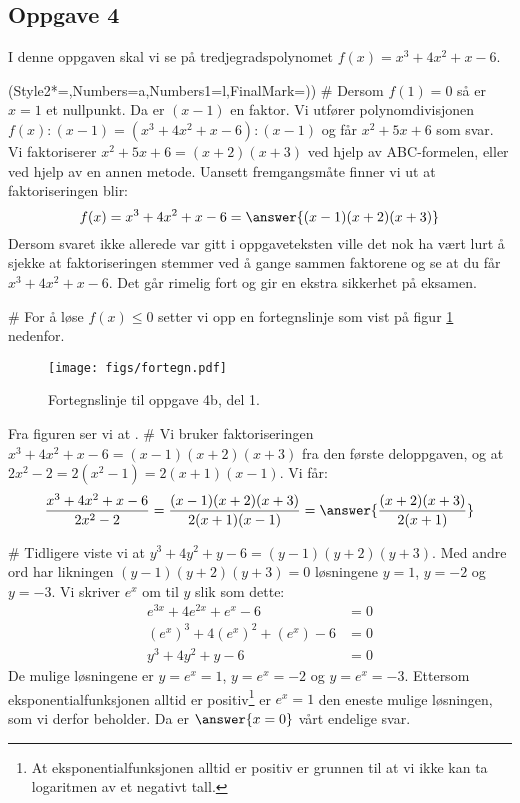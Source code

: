 \subsection*{Oppgave 4}
I denne oppgaven skal vi se på tredjegradspolynomet $f(x) = x^3 + 4x^2 + x - 6$.
\begin{easylist}[enumerate]
	\ListProperties(Style2*=,Numbers=a,Numbers1=l,FinalMark={)})
	# Dersom $f(1) = 0$ så er $x = 1$ et nullpunkt. Da er $(x-1)$ en faktor.
	Vi utfører polynomdivisjonen $f(x) : (x-1) = \left(x^3 + 4x^2 + x - 6\right): (x-1)$
	og får $x^2 + 5x + 6$ som svar. Vi faktoriserer $x^2 + 5x + 6 = (x+2)(x+3)$
	ved hjelp av ABC-formelen, eller ved hjelp av en annen metode.
	Uansett fremgangsmåte finner vi ut at faktoriseringen blir:
	\begin{equation*}
		f(x) = x^3 + 4x^2 + x - 6 = \answer{(x-1)(x+2) (x+3)}
	\end{equation*}
	Dersom svaret ikke allerede var gitt i oppgaveteksten ville det nok ha vært lurt å sjekke at faktoriseringen stemmer ved å gange sammen faktorene og
	se at du får $x^3 + 4x^2 + x - 6$. Det går rimelig fort og gir en ekstra sikkerhet på eksamen.
	
	# For å løse $f(x) \leq 0$ setter vi opp en fortegnslinje som vist på figur \ref{fig:fortegn} nedenfor.
	\begin{figure}[th!]
		\centering
		\texttt{[image: figs/fortegn.pdf]}
		\caption{Fortegnslinje til oppgave 4b, del 1.}
		\label{fig:fortegn}
	\end{figure}

	Fra figuren ser vi at .
	# Vi bruker faktoriseringen $x^3 + 4x^2 + x - 6 = (x-1)(x+2) (x+3)$
	fra den første deloppgaven, og at $2x^2 - 2 = 2 (x^2 - 1) = 2(x+1)(x-1)$. Vi får:
	\begin{equation*}
		\frac{x^3 + 4x^2 + x - 6}{2x^2 - 2} = \frac{(x-1)(x+2) (x+3)}{2(x+1)(x-1)} = \answer{\frac{(x+2) (x+3)}{2(x+1)}}
	\end{equation*}
	
	# Tidligere viste vi at $y^3 + 4y^2 + y - 6 = (y-1)(y+2) (y+3)$.
	Med andre ord har likningen $(y-1)(y+2) (y+3) = 0$ løsningene $y = 1$, $y = -2$ og $y = -3$.
	Vi skriver $e^x$ om til $y$ slik som dette:
	\begin{align*}
		e^{3x} + 4e^{2x} + e^{x} - 6 &= 0 \\
		\left(e^x\right)^3 + 4\left(e^x\right)^2 + \left(e^x\right) - 6 &= 0 \\
		y^3 + 4y^2 + y - 6 &= 0
	\end{align*}
	De mulige løsningene er $y = e^x = 1$, $y = e^x = -2$ og $y = e^x = -3$.
	Ettersom eksponentialfunksjonen alltid er positiv\footnote{At eksponentialfunksjonen alltid er positiv er grunnen til at vi ikke kan ta logaritmen av et negativt tall.} er $e^x = 1$
	den eneste mulige løsningen, som vi derfor beholder. Da er $\answer{x = 0}$ vårt endelige svar.
\end{easylist}

